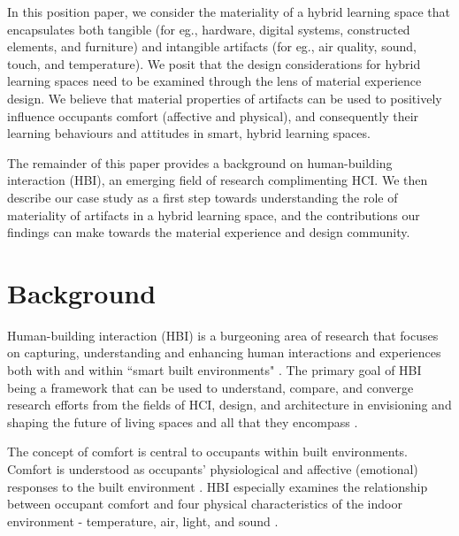 \documentclass[acmconf, anonymous, review]{acmart}
\begin{document}
In this position paper, we consider the materiality of a hybrid learning space that encapsulates both tangible (for eg., hardware, digital systems, constructed elements, and furniture) and intangible artifacts (for eg., air quality, sound, touch, and temperature). We posit that the design considerations for hybrid learning spaces need to be examined through the lens of material experience design. We believe that material properties of artifacts can be used to positively influence occupants comfort (affective and physical), and consequently their learning behaviours and attitudes in smart, hybrid learning spaces.


The remainder of this paper provides a background on human-building interaction (HBI), an emerging field of research complimenting HCI. We then describe our case study as a first step towards understanding the role of materiality of artifacts in a hybrid learning space, and the contributions our findings can make towards the material experience and design community. 


\section{Background}
Human-building interaction (HBI) is a burgeoning area of research that focuses on capturing, understanding and enhancing human interactions and experiences both with and within ``smart built environments" \cite{alavi2016future}. The primary goal of HBI being a framework that can be used to understand, compare, and converge research efforts from the fields of HCI, design, and architecture in envisioning and shaping the future of living spaces and all that they encompass \cite{nembrini2017human, alavi2018artifacts}. 

The concept of comfort is central to occupants within built environments. Comfort is understood as occupants' physiological and affective (emotional) responses to the built environment \cite{alavi2017comfort}. HBI especially examines the relationship between occupant comfort and four physical characteristics of the indoor environment - temperature, air, light, and sound \cite{hawkes2007environmental, bluyssen2009indoor}. 
\end{document}

